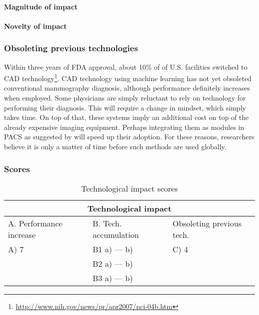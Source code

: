 \paragraph{Magnitude of impact}

\paragraph{Novelty of impact}

\subsubsection{Obsoleting previous technologies}
Within three years of FDA approval, about 10\% of of U.S. facilities switched to
CAD technology\footnote{\url{http://www.nih.gov/news/pr/apr2007/nci-04b.htm}}.
CAD technology using machine learning has not yet obsoleted conventional
mammography diagnosis, although performance definitely increases when employed.
Some physicians are simply reluctant to rely on technology for performing their
diagnosis. This will require a change in mindset, which simply takes time.
On top of that, these systems imply an additional cost on top of the already
expensive imaging equipment. Perhaps integrating them as modules in PACS as
suggested by \cite{cadhistory} will speed up their adoption. For these reasons,
researchers believe it is only a matter of time before such methods are used
globally.

\subsubsection{Scores}
\begin{table}[h]
\centering
\begin{tabular}{l l l}
\hline
\multicolumn{3}{|c|}{Technological impact} \\
\hline
A. Performance increase & B. Tech. accumulation & Obsoleting previous tech.\\
A) 7  & B1 a)  --- b)  & C) 4\\ 
     & B2 a)  --- b)  & \\
     & B3 a)  --- b)  & \\
\hline
\end{tabular}
\caption{Technological impact scores}
\label{tbl:impactscores5}
\end{table}